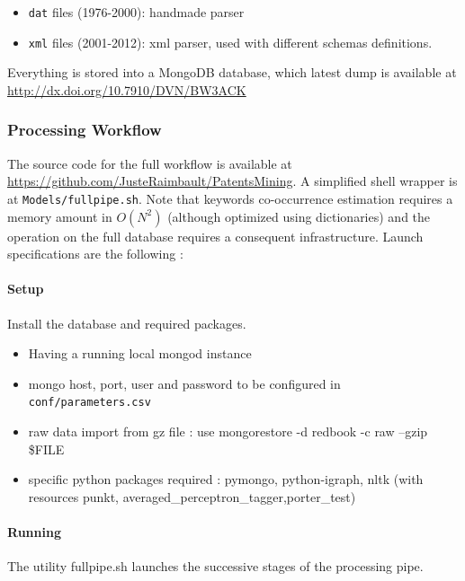 \documentclass[12pt,twoside,a4paper]{article}
\begin{document}
\begin{itemize}
\item \texttt{dat} files (1976-2000): handmade parser
\item \texttt{xml} files (2001-2012): xml parser, used with different schemas definitions.
\end{itemize}

Everything is stored into a MongoDB database, which latest dump is available at %
\url{http://dx.doi.org/10.7910/DVN/BW3ACK} %

\subsubsection*{Processing Workflow}

The source code for the full workflow is available at \url{https://github.com/JusteRaimbault/PatentsMining}. A simplified shell wrapper is at \texttt{Models/fullpipe.sh}. Note that keywords co-occurrence estimation requires a memory amount in $O(N^2)$ (although optimized using dictionaries) and the operation on the full database requires a consequent infrastructure. Launch specifications are the following :

\paragraph*{Setup} 

Install the database and required packages.

\begin{itemize}
\item Having a running local mongod instance
\item mongo host, port, user and password to be configured in \texttt{conf/parameters.csv}
\item raw data import from gz file : use mongorestore -d redbook -c raw --gzip {\$}FILE
\item specific python packages required : pymongo, python-igraph, nltk (with resources punkt, averaged{\_}perceptron{\_}tagger,porter{\_}test)
\end{itemize}

\paragraph*{Running}

The utility fullpipe.sh launches the successive stages of the processing pipe.
\end{document}
